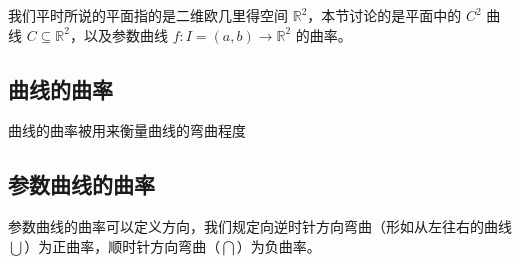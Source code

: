 
\begin{issues}
\issueDraft
\end{issues}


我们平时所说的平面指的是二维欧几里得空间 $\mathbb{R}^2$，本节讨论的是平面中的 $C^2$ 曲线 $C \subseteq \mathbb{R}^2$，以及参数曲线 $f: I = (a, b) \to \mathbb{R}^2$ 的曲率。

\subsection{曲线的曲率}

曲线的曲率被用来衡量曲线的弯曲程度

\subsection{参数曲线的曲率}

参数曲线的曲率可以定义方向，我们规定向逆时针方向弯曲（形如从左往右的曲线$\bigcup$）为正曲率，顺时针方向弯曲（$\bigcap$）为负曲率。